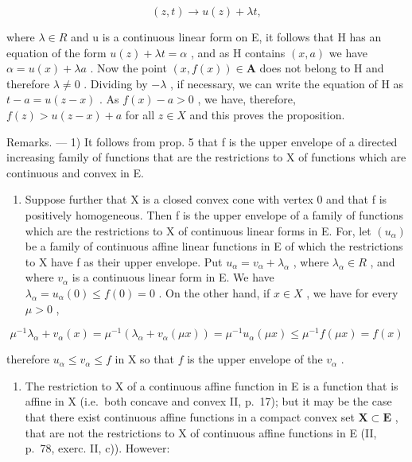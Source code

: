 \[
(z, t) \rightarrow u (z) + \lambda t,
\]

where \(\lambda\in R\) and u is a continuous linear form on E, it follows that H has an equation of the form \(u(z)+\lambda t=\alpha\) , and as H contains \((x,a)\) we have \(\alpha=u(x)+\lambda a\) . Now the point \((x,f(x))\in\mathbf{A}\) does not belong to H and therefore \(\lambda\neq0\) . Dividing by \(-\lambda\) , if necessary, we can write the equation of H as \(t-a=u(z-x)\) . As \(f(x)-a>0\) , we have, therefore, \(f(z)>u(z-x)+a\) for all \(z\in X\) and this proves the proposition.

Remarks. --- 1) It follows from prop. 5 that f is the upper envelope of a directed increasing family of functions that are the restrictions to X of functions which are continuous and convex in E.

\begin{enumerate}
\def\labelenumi{\arabic{enumi})}
\setcounter{enumi}{1}
\tightlist
\item
  Suppose further that X is a closed convex cone with vertex 0 and that f is positively homogeneous. Then f is the upper envelope of a family of functions which are the restrictions to X of continuous linear forms in E. For, let \((u_{\alpha})\) be a family of continuous affine linear functions in E of which the restrictions to X have f as their upper envelope. Put \(u_{\alpha} = v_{\alpha} + \lambda_{\alpha}\) , where \(\lambda_{\alpha} \in R\) , and where \(v_{\alpha}\) is a continuous linear form in E. We have \(\lambda_{\alpha} = u_{\alpha}(0) \leqslant f(0) = 0\) . On the other hand, if \(x \in X\) , we have for every \(\mu > 0\) ,
\end{enumerate}

\[
\mu^ {- 1} \lambda_ {\alpha} + v _ {\alpha} (x) = \mu^ {- 1} (\lambda_ {\alpha} + v _ {\alpha} (\mu x)) = \mu^ {- 1} u _ {\alpha} (\mu x) \leqslant \mu^ {- 1} f (\mu x) = f (x)
\]

therefore \(u_{\alpha} \leqslant v_{\alpha} \leqslant f\) in X so that \(f\) is the upper envelope of the \(v_{\alpha}\) .

\begin{enumerate}
\def\labelenumi{\arabic{enumi})}
\setcounter{enumi}{2}
\tightlist
\item
  The restriction to X of a continuous affine function in E is a function that is affine in X (i.e.~both concave and convex II, p.~17); but it may be the case that there exist continuous affine functions in a compact convex set \(\mathbf{X} \subset \mathbf{E}\) , that are not the restrictions to X of continuous affine functions in E (II, p.~78, exerc. II, c)). However:
\end{enumerate}

